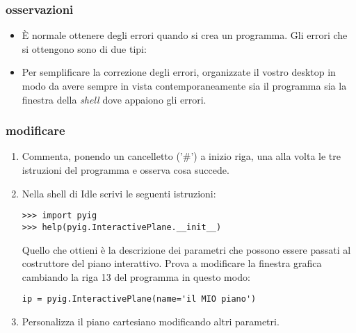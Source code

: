 \subsubsection{osservazioni}

\begin{itemize}
 \item È normale ottenere degli errori quando si crea un programma. Gli errori 
che si 
ottengono sono di due tipi:
 \item Per semplificare la correzione degli errori, organizzate il vostro 
desktop in modo da avere sempre in vista contemporaneamente sia il programma 
sia la finestra della \emph{shell} dove appaiono gli errori.
\end{itemize}

\subsubsection{modificare}

\begin{enumerate} [noitemsep]
 \item Commenta, ponendo un cancelletto ('\#') a inizio riga, una alla volta le 
tre istruzioni del programma e osserva cosa succede.
 \item Nella shell di Idle scrivi le seguenti istruzioni:
 \begin{lstlisting}[numbers=none]
>>> import pyig
>>> help(pyig.InteractivePlane.__init__)
 \end{lstlisting}
Quello che ottieni è la descrizione dei parametri che possono essere passati al 
costruttore del piano interattivo.
Prova a modificare la finestra grafica cambiando la riga 13 del programma in 
questo modo:
 \begin{lstlisting}[firstnumber=13]
ip = pyig.InteractivePlane(name='il MIO piano')
 \end{lstlisting}
 \item Personalizza il piano cartesiano modificando altri parametri.
\end{enumerate}

